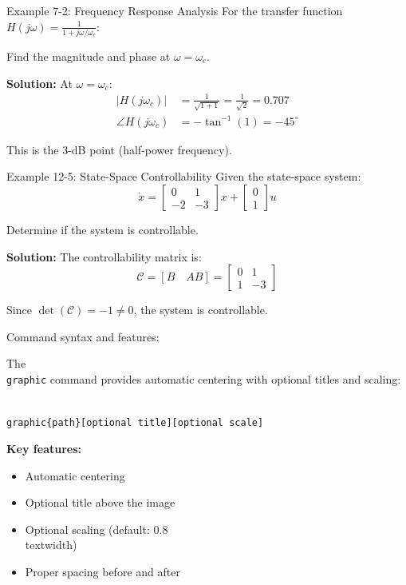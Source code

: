 \documentclass{../homework}
\begin{document}
\begin{example}{Example 7-2: Frequency Response Analysis}
For the transfer function $H(j\omega) = \frac{1}{1 + j\omega/\omega_c}$:

Find the magnitude and phase at $\omega = \omega_c$.

\textbf{Solution:}
At $\omega = \omega_c$:
\begin{align}
|H(j\omega_c)| &= \frac{1}{\sqrt{1 + 1}} = \frac{1}{\sqrt{2}} = 0.707 \\
\angle H(j\omega_c) &= -\tan^{-1}(1) = -45^\circ
\end{align}

This is the 3-dB point (half-power frequency).
\end{example}

\begin{example}{Example 12-5: State-Space Controllability}
Given the state-space system:
$$\dot{x} = \begin{bmatrix} 0 & 1 \\ -2 & -3 \end{bmatrix} x + \begin{bmatrix} 0 \\ 1 \end{bmatrix} u$$

Determine if the system is controllable.

\textbf{Solution:}
The controllability matrix is:
$$\mathcal{C} = [B \quad AB] = \begin{bmatrix} 0 & 1 \\ 1 & -3 \end{bmatrix}$$

Since $\det(\mathcal{C}) = -1 \neq 0$, the system is controllable.
\end{example}


\subproblem
Command syntax and features:

The \texttt{\\graphic} command provides automatic centering with optional titles and scaling:

\texttt{\\graphic\{path\}[optional title][optional scale]}

\textbf{Key features:}
\begin{itemize}
\item Automatic centering
\item Optional title above the image
\item Optional scaling (default: 0.8\\textwidth)
\item Proper spacing before and after
\end{itemize}
\end{document}
